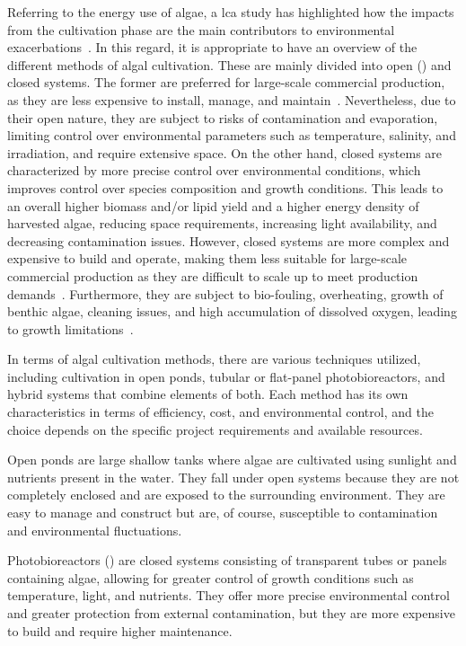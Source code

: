 Referring to the energy use of algae, a \gls{lca} study has highlighted how the impacts from the cultivation phase are the main contributors to environmental exacerbations~\parencite{clarens_Environmental_2010}. In this regard, it is appropriate to have an overview of the different methods of algal cultivation. These are mainly divided into open () and closed systems. The former are preferred for large-scale commercial production, as they are less expensive to install, manage, and maintain~\parencite{roselet_Comparison_2013}. Nevertheless, due to their open nature, they are subject to risks of contamination and evaporation, limiting control over environmental parameters such as temperature, salinity, and irradiation, and require extensive space. On the other hand, closed systems are characterized by more precise control over environmental conditions, which improves control over species composition and growth conditions. This leads to an overall higher biomass and/or lipid yield and a higher energy density of harvested algae, reducing space requirements, increasing light availability, and decreasing contamination issues. However, closed systems are more complex and expensive to build and operate, making them less suitable for large-scale commercial production as they are difficult to scale up to meet production demands~\parencite{resurreccion_Comparison_2012}. Furthermore, they are subject to bio-fouling, overheating, growth of benthic algae, cleaning issues, and high accumulation of dissolved oxygen, leading to growth limitations~\parencite{narala_Comparison_2016}.


In terms of algal cultivation methods, there are various techniques utilized, including cultivation in open ponds, tubular or flat-panel photobioreactors, and hybrid systems that combine elements of both. Each method has its own characteristics in terms of efficiency, cost, and environmental control, and the choice depends on the specific project requirements and available resources.

Open ponds are large shallow tanks where algae are cultivated using sunlight and nutrients present in the water. They fall under open systems because they are not completely enclosed and are exposed to the surrounding environment. They are easy to manage and construct but are, of course, susceptible to contamination and environmental fluctuations.

Photobioreactors () are closed systems consisting of transparent tubes or panels containing algae, allowing for greater control of growth conditions such as temperature, light, and nutrients. They offer more precise environmental control and greater protection from external contamination, but they are more expensive to build and require higher maintenance.

